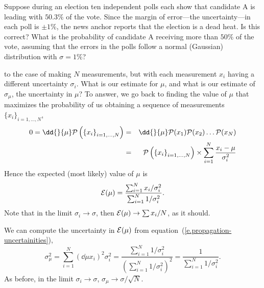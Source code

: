 \begin{exercisebox}
Suppose during an election ten independent polls each show that candidate A is leading with $50.3\%$ of the vote. Since the margin of error---the uncertainty---in each poll is $\pm 1\%$, the news anchor reports that the election is a dead heat.  Is this correct?  What is the probability of candidate A receiving more than $50\%$ of the vote, assuming that the errors in the polls follow a normal (Gaussian) distribution with $\sigma = 1\%$?
\end{exercisebox}

 to the case of making $N$ measurements, but with each measurement $x_{i}$ having a different uncertainty $\sigma_{i}$.  What is our estimate for $\mu$, and what is our estimate of $\sigma_{\mu}$, the uncertainty in $\mu$?  To answer, we go back to finding the value of $\mu$ that maximizes the probability of us obtaining a sequence of measurements $\{x_{i}\}_{i=1,\ldots,N}$,
\begin{eqnarray*}
	0 = \dd{}{\mu}\prob\left(\left\{x_{i}\right\}_{i=1,\ldots,N}\right) &=& 
		\dd{}{\mu}\prob(x_{1})\prob(x_{2})\ldots\prob(x_{N})\\
	&=&	\prob\left(\left\{x_{i}\right\}_{i=1,\ldots,N}\right) 
		\times \sum_{i=1}^{N}\frac{x_{i}-\mu}{\sigma_{i}^{2}}
\end{eqnarray*}
Hence the expected (most likely) value of $\mu$ is
\begin{equation}
	\mathcal{E}(\mu) = \frac{\sum_{i=1}^{N} x_{i}/\sigma_{i}^{2}}{\sum_{i=1}^{N} 1/\sigma_{i}^{2}}.
\end{equation}
Note that in the limit $\sigma_{i}\to \sigma$, then $\mathcal{E}(\mu)\to \sum x_{i}/N$, as it should.

We can compute the uncertainty in $\mathcal{E}(\mu)$ 
from equation~(\ref{e.propagation-uncertainities}),
\begin{equation}
	\sigma_{\mu}^{2} = \sum_{i=1}^{N} \left(\dd{\mu}{x_{i}}\right)^{2} \sigma_{i}^{2} = \frac{\sum_{i=1}^{N}1/\sigma_{i}^{2}}{\left(\sum_{i=1}^{N}1/\sigma_{i}^{2}\right)^{2}} = \frac{1}{\sum_{i=1}^{N}1/\sigma_{i}^{2}}.
\end{equation}
As before, in the limit $\sigma_{i}\to\sigma$, $\sigma_{\mu}\to\sigma/\sqrt{N}$.


